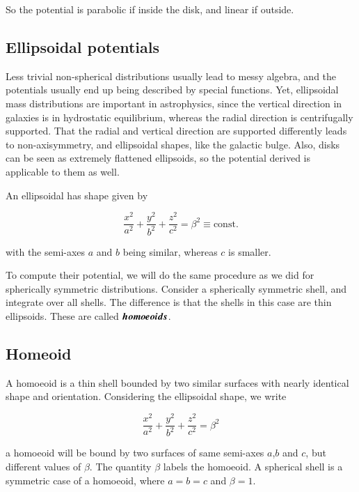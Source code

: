 So the potential is parabolic if inside the disk, and linear if outside.


\subsection{Ellipsoidal potentials}

Less trivial non-spherical distributions usually lead to messy algebra, and the potentials usually end up being described by special functions. Yet, ellipsoidal mass distributions are important in astrophysics, since the vertical direction in galaxies is in hydrostatic equilibrium, whereas the radial direction is centrifugally supported. That the radial and vertical direction are supported differently leads to non-axisymmetry, and ellipsoidal shapes, like the galactic bulge. Also, disks can be seen as extremely flattened ellipsoids, so the potential derived is applicable to them as well. 
    


An ellipsoidal has shape given by

\begin{equation}
\frac{x^2}{a^2} + \frac{y^2}{b^2} + \frac{z^2}{c^2} = \beta^2 \equiv \mathrm{const.}
\end{equation}

with the semi-axes $a$ and $b$ being similar, whereas $c$ is smaller. 



To compute their potential, we will do the same procedure as we did for spherically symmetric distributions. Consider a spherically symmetric shell, and integrate over all shells. The difference is that the shells in this case are thin ellipsoids. These are called ${\boldsymbol{homoeoids}}$.

\subsection{Homeoid}


A homoeoid is a thin shell bounded by two similar surfaces with nearly identical shape and orientation. Considering the ellipsoidal shape, we write  

\begin{equation}
\frac{x^2}{a^2} + \frac{y^2}{b^2} + \frac{z^2}{c^2} = \beta^2
\end{equation}

a homoeoid will be bound by two surfaces of same semi-axes $a$,$b$ and $c$, but different values of $\beta$. The quantity $\beta$ labels the homoeoid. A spherical shell is a symmetric case of a homoeoid, where $a=b=c$ and $\beta=1$.

